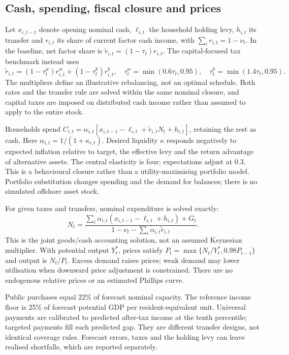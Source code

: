 \subsection{Cash, spending, fiscal closure and prices}
Let $x_{i,t-1}$ denote opening nominal cash, $\ell_{i,t}$ the household holding levy, $h_{i,t}$ its transfer and $r_{i,t}$ its share of current factor cash income, with $\sum_i r_{i,t}=1-\nu_t$. In the baseline, net factor share is $\widetilde r_{i,t}=(1-\tau_t)r_{i,t}$. The capital-focused tax benchmark instead uses
\begin{equation}
\widetilde r_{i,t}=(1-\tau^w_t)r^w_{i,t}+(1-\tau^k_t)r^k_{i,t},\quad
\tau^w_t=\min(0.6\tau_t,0.95),\quad\tau^k_t=\min(1.4\tau_t,0.95).
\end{equation}
The multipliers define an illustrative rebalancing, not an optimal schedule. Both rates and the transfer rule are solved within the same nominal closure, and capital taxes are imposed on distributed cash income rather than assumed to apply to the entire stock.

Households spend $C_{i,t}=\alpha_{i,t}[x_{i,t-1}-\ell_{i,t}+\widetilde r_{i,t}N_t+h_{i,t}]$, retaining the rest as cash. Here $\alpha_{i,t}=1/(1+\kappa_{i,t})$. Desired liquidity $\kappa$ responds negatively to expected inflation relative to target, the effective levy and the return advantage of alternative assets. The central elasticity is four; expectations adjust at 0.3. This is a behavioural closure rather than a utility-maximising portfolio model. Portfolio substitution changes spending and the demand for balances; there is no simulated offshore asset stock.

For given taxes and transfers, nominal expenditure is solved exactly:
\begin{equation}
N_t=\frac{\sum_i\alpha_{i,t}(x_{i,t-1}-\ell_{i,t}+h_{i,t})+G_t}
{1-\nu_t-\sum_i\alpha_{i,t}\widetilde r_{i,t}}.\label{eq:closuremain}
\end{equation}
This is the joint goods/cash accounting solution, not an assumed Keynesian multiplier. With potential output $Y_t^*$, prices satisfy $P_t=\max\{N_t/Y_t^*,0.98P_{t-1}\}$ and output is $N_t/P_t$. Excess demand raises prices; weak demand may lower utilisation when downward price adjustment is constrained. There are no endogenous relative prices or an estimated Phillips curve.

Public purchases equal 22\% of forecast nominal capacity. The reference income floor is 25\% of forecast potential GDP per resident-equivalent unit. Universal payments are calibrated to predicted after-tax income at the tenth percentile; targeted payments fill each predicted gap. They are different transfer designs, not identical coverage rules. Forecast errors, taxes and the holding levy can leave realised shortfalls, which are reported separately.

